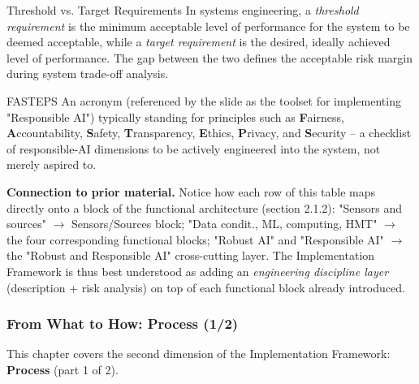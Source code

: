 \begin{defbox}{Threshold vs. Target Requirements}
In systems engineering, a \emph{threshold requirement} is the minimum acceptable level of performance for the system to be deemed acceptable, while a \emph{target requirement} is the desired, ideally achieved level of performance. The gap between the two defines the acceptable risk margin during system trade-off analysis.
\end{defbox}

\begin{defbox}{FASTEPS}
An acronym (referenced by the slide as the toolset for implementing "Responsible AI") typically standing for principles such as \textbf{F}airness, \textbf{A}ccountability, \textbf{S}afety, \textbf{T}ransparency, \textbf{E}thics, \textbf{P}rivacy, and \textbf{S}ecurity -- a checklist of responsible-AI dimensions to be actively engineered into the system, not merely aspired to.
\end{defbox}

\textbf{Connection to prior material.} Notice how each row of this table maps directly onto a block of the functional architecture (section 2.1.2): "Sensors and sources" $\rightarrow$ Sensors/Sources block; "Data condit., ML, computing, HMT" $\rightarrow$ the four corresponding functional blocks; "Robust AI" and "Responsible AI" $\rightarrow$ the "Robust and Responsible AI" cross-cutting layer. The Implementation Framework is thus best understood as adding an \emph{engineering discipline layer} (description + risk analysis) on top of each functional block already introduced.

\subsubsection{From What to How: Process (1/2)}

This chapter covers the second dimension of the Implementation Framework: \textbf{Process} (part 1 of 2).

